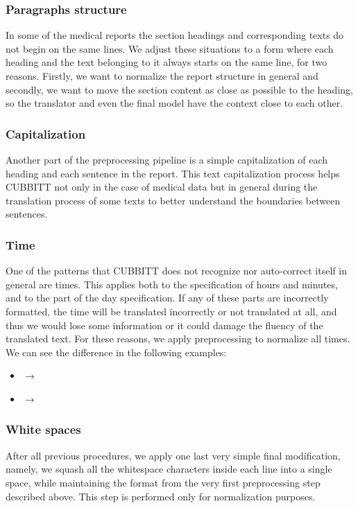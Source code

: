\subsubsection*{Paragraphs structure}
In some of the medical reports the section headings and corresponding texts do not begin on the same lines. We adjust these situations to a form where each heading and the text belonging to it always starts on the same line, for two reasons. Firstly, we want to normalize the report structure in general and secondly, we want to move the section content as close as possible to the heading, so the translator and even the final model have the context close to each other.

\subsubsection*{Capitalization}
Another part of the preprocessing pipeline is a simple capitalization of each heading and each sentence in the report. This text capitalization process helps CUBBITT not only in the case of medical data but in general during the translation process of some texts to better understand the boundaries between sentences.

\subsubsection*{Time}
One of the patterns that CUBBITT does not recognize nor auto-correct itself in general are times. This applies both to the specification of hours and minutes, and to the  part of the day specification. If any of these parts are incorrectly formatted, the time will be translated incorrectly or not translated at all, and thus we would lose some information or it could damage the fluency of the translated text. For these reasons, we apply preprocessing to normalize all times. We can see the difference in the following examples:
\begin{itemize}
	\item {} $\rightarrow$ 
	\item {} $\rightarrow$ 
\end{itemize}

\subsubsection*{White spaces}
After all previous procedures, we apply one last very simple final modification, namely, we squash all the whitespace characters inside each line into a single space, while maintaining the format from the very first preprocessing step described above. This step is performed only for normalization purposes.

